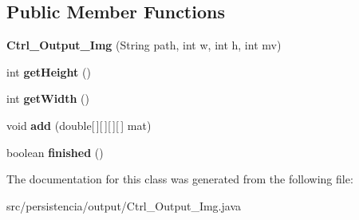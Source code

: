 \subsection*{Public Member Functions}
\begin{DoxyCompactItemize}
\item 
\mbox{\label{classpersistencia_1_1output_1_1Ctrl__Output__Img_aa3f2948dd4645d8b121eedf30daa0c3f}} 
{\bfseries Ctrl\+\_\+\+Output\+\_\+\+Img} (String path, int w, int h, int mv)
\item 
\mbox{\label{classpersistencia_1_1output_1_1Ctrl__Output__Img_aaf087f80fc9410ca6edbe2cbc424b502}} 
int {\bfseries get\+Height} ()
\item 
\mbox{\label{classpersistencia_1_1output_1_1Ctrl__Output__Img_a6efcf821f0a1097a7edd24c23e0da409}} 
int {\bfseries get\+Width} ()
\item 
\mbox{\label{classpersistencia_1_1output_1_1Ctrl__Output__Img_a305a977f4d4b999cf65e14e7106b6c5e}} 
void {\bfseries add} (double\mbox{[}$\,$\mbox{]}\mbox{[}$\,$\mbox{]}\mbox{[}$\,$\mbox{]}\mbox{[}$\,$\mbox{]} mat)
\item 
\mbox{\label{classpersistencia_1_1output_1_1Ctrl__Output__Img_af8fd6acb8727f25014cc5ecca9a216cf}} 
boolean {\bfseries finished} ()
\end{DoxyCompactItemize}


The documentation for this class was generated from the following file\+:\begin{DoxyCompactItemize}
\item 
src/persistencia/output/Ctrl\+\_\+\+Output\+\_\+\+Img.\+java\end{DoxyCompactItemize}
